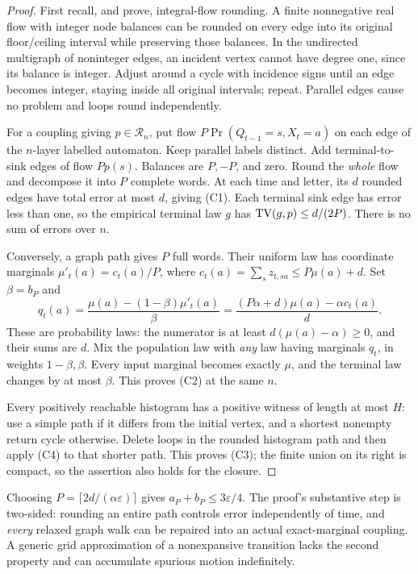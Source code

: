 \documentclass[11pt]{article}
\begin{document}
\begin{proof}
First recall, and prove, integral-flow rounding. A finite nonnegative real flow with integer node balances can be rounded on every edge into its original floor/ceiling interval while preserving those balances. In the undirected multigraph of noninteger edges, an incident vertex cannot have degree one, since its balance is integer. Adjust around a cycle with incidence signs until an edge becomes integer, staying inside all original intervals; repeat. Parallel edges cause no problem and loops round independently.

For a coupling giving $p\in\mathcal R_n$, put flow $P\Pr(Q_{t-1}=s,X_t=a)$ on each edge of the $n$-layer labelled automaton. Keep parallel labels distinct. Add terminal-to-sink edges of flow $Pp(s)$. Balances are $P,-P$, and zero. Round the \emph{whole} flow and decompose it into $P$ complete words. At each time and letter, its $d$ rounded edges have total error at most $d$, giving (C1). Each terminal sink edge has error less than one, so the empirical terminal law $g$ has ${\rm TV}(g,p)\le d/(2P)$. There is no sum of errors over $n$.

Conversely, a graph path gives $P$ full words. Their uniform law has coordinate marginals $\mu'_t(a)=c_t(a)/P$, where $c_t(a)=\sum_s z_{t,sa}\le P\mu(a)+d$. Set $\beta=b_P$ and
\[
q_t(a)=\frac{\mu(a)-(1-\beta)\mu'_t(a)}\beta
=\frac{(P\alpha+d)\mu(a)-\alpha c_t(a)}d.
\tag{C4}
\]
These are probability laws: the numerator is at least $d(\mu(a)-\alpha)\ge0$, and their sums are $d$. Mix the population law with \emph{any} law having marginals $q_t$, in weights $1-\beta,\beta$. Every input marginal becomes exactly $\mu$, and the terminal law changes by at most $\beta$. This proves (C2) at the same $n$.

Every positively reachable histogram has a positive witness of length at most $H$: use a simple path if it differs from the initial vertex, and a shortest nonempty return cycle otherwise. Delete loops in the rounded histogram path and then apply (C4) to that shorter path. This proves (C3); the finite union on its right is compact, so the assertion also holds for the closure.
\end{proof}

Choosing $P=\lceil2d/(\alpha\varepsilon)\rceil$ gives $a_P+b_P\le3\varepsilon/4$. The proof's substantive step is two-sided: rounding an entire path controls error independently of time, and \emph{every} relaxed graph walk can be repaired into an actual exact-marginal coupling. A generic grid approximation of a nonexpansive transition lacks the second property and can accumulate spurious motion indefinitely.
\end{document}
